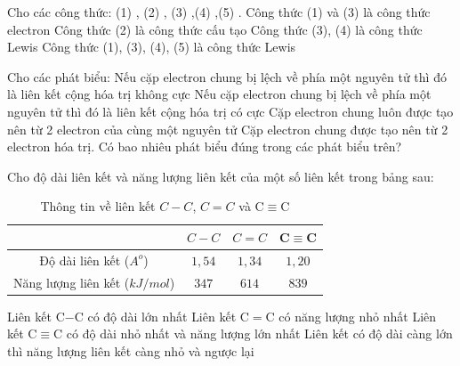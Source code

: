 \begin{ex}
	Cho các công thức: (1)  ,\quad
	(2) ,\quad
	(3)  ,\quad (4)  ,\quad (5) .
	\choiceTF
	{Công thức (1) và (3) là công thức electron}
	{\True Công thức (2) là công thức cấu tạo}
	{\True Công thức (3), (4) là công thức Lewis}
	{Công thức (1), (3), (4), (5) là công thức Lewis}
	\loigiai{}
\end{ex}
\begin{ex}[CD - SGK]
	Cho các phát biểu:
	\choiceTF
	{Nếu cặp electron chung bị lệch về phía một nguyên tử thì đó là liên kết cộng hóa trị không cực}
	{\True Nếu cặp electron chung bị lệch về phía một nguyên tử thì đó là liên kết cộng hóa trị có cực}
	{Cặp electron chung luôn được tạo nên từ 2 electron của cùng một nguyên tử}
	{\True Cặp electron chung được tạo nên từ 2 electron hóa trị. Có bao nhiêu phát biểu đúng trong các phát biểu trên?}
	\loigiai{}
\end{ex}
\begin{ex}
	Cho độ dài liên kết và năng lượng liên kết của một số liên kết trong bảng sau:
	\begin{table}[h]
		\centering
		\begin{tabular}{|c|c|c|c|}
			\hline
			& $C-C$ & $C=C$ & C$\equiv$C \\
			\hline
			Độ dài liên kết ($A^{o}$) & $1{,}54$ & $1{,}34$ & $1{,}20$ \\
			\hline
			Năng lượng liên kết ($kJ/mol$) & $347$ & $614$ & $839$ \\
			\hline
		\end{tabular}
		\caption{Thông tin về liên kết $C-C$, $C=C$ và C$\equiv$C}
		\label{bang_lienket_cacbon}
	\end{table}
	\choiceTF
	{\True Liên kết C$-$C có độ dài lớn nhất}
	{Liên kết C$=$C có năng lượng nhỏ nhất}
	{Liên kết C$\equiv$C có độ dài nhỏ nhất và năng lượng lớn nhất}
	{\True Liên kết có độ dài càng lớn thì năng lượng liên kết càng nhỏ và ngược lại}
\end{ex}
